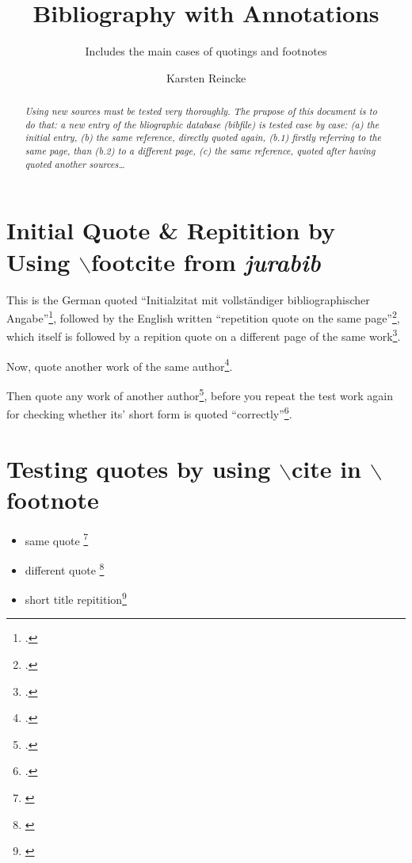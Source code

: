 \documentclass[DIV=calc,BCOR=5mm,11pt,headings=small,oneside,abstract=true, toc=bib]{scrartcl}
\begin{document}
\nocite{*}

\titlehead{Testing the Bibliography}
\subject{For evaluating \itshape{new bibliographic data}}
\title{Bibliography with Annotations}
\subtitle{Includes the main cases of quotings and footnotes}
\author{Karsten Reincke}
\maketitle

\begin{abstract}
\noindent \itshape
Using new sources must be tested very thoroughly. The prupose of this document
is to do that: a new entry of the bliographic database (bibfile) is tested case
by case: (a) the initial entry, (b) the same reference, directly quoted again,
(b.1) firstly referring to the same page, than (b.2) to a different page, (c)
the same reference, quoted after having quoted another sources\ldots
\end{abstract}
\footnotesize
\normalsize

\section{Initial Quote \& Repitition by Using $\backslash$footcite from
\emph{jurabib}}

This is the German quoted \foreignquote{german}{Initialzitat mit
vollständiger bibliographischer Angabe}\footcite[cf.][123pp]{Covey2006a}, followed by
the English written \foreignquote{english}{repetition quote on the same
page}\footcite[cf.][123ff]{Covey2006a}, which itself is followed by a
repition quote on a different page of the same
work\footcite[cf.][125p]{Covey2006a}.

Now, quote another work of the same author\footcite[cf.][321]{Covey2006a}.

Then quote any work of another author\footcite[cf.][42]{KantKdU1974}, before you
repeat the test work again for checking whether its' short form is quoted
\enquote{correctly}\footcite[cf.][123]{Covey2006a}.

\section{Testing quotes by using $\backslash$cite in $\backslash$footnote}

\begin{itemize}
  \item same quote \footnote{\cite[cf.][125]{Covey2006a}}
  \item different quote \footnote{\cite[cf.][42]{KantKdU1974}}
  \item short title repitition\footnote{\cite[cf.][125]{Covey2006a}}
\end{itemize}

\small

\end{document}
